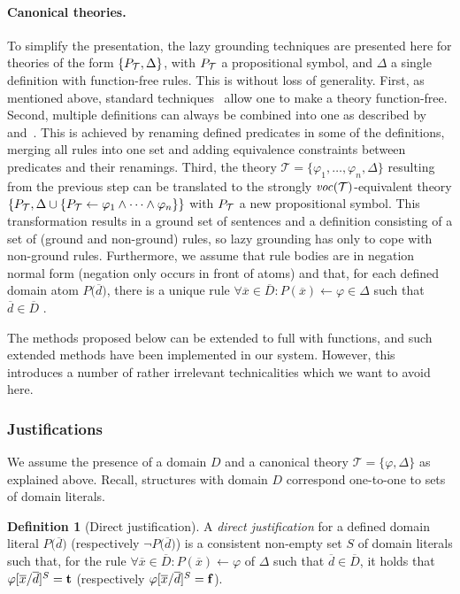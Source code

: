 \documentclass[11pt]{article}
\newcommand{\m}[1]{\ensuremath{#1}\xspace}
\newcommand{\trval}[1]{\m{{\bf #1}}}
\newcommand{\lrule}{\m{\leftarrow}}
\newcommand{\ltrue}{\trval{t}}
\newcommand{\lfalse}{\trval{f}}
\newcommand{\theory}{\m{\mathcal{T}}}
\newcommand{\D}{\m{\Delta}}
\newcommand{\f}{\m{\varphi}}
\newcommand{\xxx}{\m{\overline{x}}}
\newcommand{\ddd}{\m{\overline{d}}}
\newcommand{\bracketddd}{\m{\big(\overline{d}\big)}}
\newcommand{\DDD}{\m{\overline{D}}}
\newcommand{\typed}[2]{\m{#1\in #2:}}
\newcommand{\logicname}[1]{\text{\sc #1}\xspace}
\newcommand{\foid}{\logicname{FO(\ensuremath{ID})}}
\theoremstyle{plain}
\theoremstyle{definition}
\newtheorem{definition}[thm]{Definition}
\theoremstyle{example_basic}
\theoremstyle{example_contd}
\theoremstyle{plain}
\newcommand{\pt}{\ensuremath{P_\text{\theory}}\xspace}
\newcommand{\change}[1]{#1}
\begin{document}
\paragraph{Canonical theories.} To simplify the presentation, the lazy
grounding techniques are presented here for theories of the form
$\{\pt, \D\}$, with $\pt$ a propositional symbol, and $\D$ a single
definition with function-free rules. This is without loss of
generality. First, as mentioned above, standard
techniques~\cite{Enderton01} allow one to make a theory function-free.
Second, multiple definitions can always be combined into one as
described by~ and~. \change{This is
 achieved by renaming defined predicates in some of the definitions,
 merging all rules into one set and adding equivalence constraints
 between predicates and their renamings.  Third, the  theory $\theory=
  \{\varphi_1,\dots,\varphi_n, \D\}$ resulting from the previous step can be translated to the  strongly $\vocf{\theory}$-equivalent theory 
$\{ \pt, \D \cup \{\pt \lrule \varphi_1\land\dots\land\varphi_n\}\}$ with \pt a new propositional symbol. This transformation results in a ground set of sentences and a definition consisting of a set of (ground and non-ground) rules, so lazy grounding has only to cope with non-ground rules.
Furthermore, we assume that rule bodies are in negation normal form
(negation only occurs in front of atoms) and that, for each defined
domain atom $P\bracketddd$, there is a unique rule $\forall
\xxx\in\DDD: P(\xxx)\lrule \f \in \D$ such that $\ddd\in\DDD$ .  }

The methods proposed below can be extended to full \foid with functions, and such
extended methods have been implemented in our system. However, this introduces a
number of rather irrelevant technicalities which we want to avoid
here.


\subsubsection{Justifications}\label{sec:justifications}

\newcommand{\jgraph}{\ensuremath{J}\xspace}
\newcommand{\justification}{{justification}\xspace}

\change{We assume the presence of a domain $D$ and a canonical theory  $\theory=\{\varphi,\D\}$ as explained above. Recall, structures with domain $D$ correspond one-to-one to sets of domain literals. }

\begin{definition}[Direct justification]
A \emph{direct justification} for a defined domain literal $P\bracketddd$ (respectively $\neg P\bracketddd$) is a consistent \change{non-empty} set $S$ of domain literals such that, for the rule $ \forall \typed{\xxx}{\DDD} P(\xxx) \lrule \f$ of $\D$ such that $\ddd \in \DDD$, it holds that $\f[\xxx\subs\ddd]^S = \ltrue$ (respectively $\f[\xxx\subs\ddd]^S = \lfalse$).
\end{definition}
\end{document}
